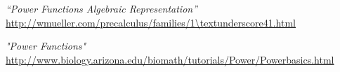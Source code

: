 \documentclass[a4paper,12pt]{article}
\begin{document}
\vspace{2cm}

\begin{thebibliography}{3}
	
	 \emph{“Power Functions Algebraic Representation”} \url{http://wmueller.com/precalculus/families/1\textunderscore41.html} 
	
	 \emph{"Power Functions"} \url{http://www.biology.arizona.edu/biomath/tutorials/Power/Powerbasics.html}
	
\end{thebibliography}

\end{document}
